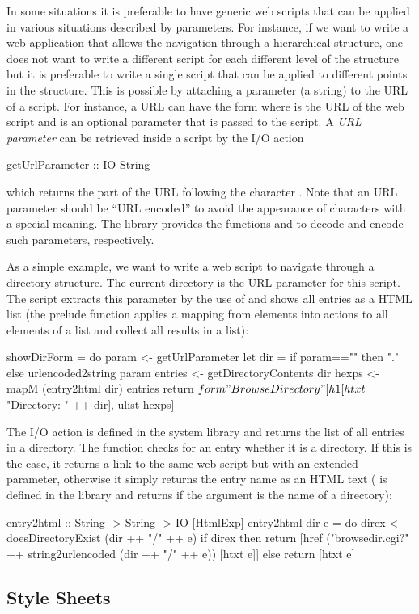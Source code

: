 In some situations it is preferable to have generic web scripts that
can be applied in various situations described by parameters.
For instance, if we want to write a web application that
allows the navigation through a hierarchical structure,
one does not want to write a different script for each different
level of the structure but it is preferable to write a single
script that can be applied to different points in the structure.
This is possible by attaching a parameter (a string)
to the URL of a script. For instance, a URL can have the form
 where
 is the URL of the web script
and  is an optional parameter that is passed
to the script.
A \emph{URL parameter}
can be retrieved inside a script
by the I/O action
%
\begin{curry}
getUrlParameter :: IO String
\end{curry}
%
which returns the part of the URL following the character .
Note that an URL parameter should be ``URL encoded'' to avoid
the appearance of characters with a special meaning.
The library  provides the functions
 and 
to decode and encode such parameters, respectively.

As a simple example, we want to write a web script to navigate
through a directory structure. The current directory
is the URL parameter for this script. The script
extracts this parameter by the use of 
and shows all entries as a HTML list
(the prelude function  applies
a mapping from elements into actions to all elements of a list
and collect all results in a list):
%
\begin{curry}
showDirForm = do
  param <- getUrlParameter
  let dir = if param=="" then "." else urlencoded2string param
  entries <- getDirectoryContents dir
  hexps <- mapM (entry2html dir) entries
  return $ form "Browse Directory"
                [h1 [htxt $ "Directory: " ++ dir], ulist hexps]
\end{curry}
%
The I/O action 
is defined in the system library 
and returns the list of all entries in a directory.
The function  checks for an entry whether it
is a directory. If this is the case, it returns a link to
the same web script but with an extended parameter, otherwise
it simply returns the entry name as an HTML text
(
is defined in the library  and returns 
if the argument is the name of a directory):
%
\begin{curry}
entry2html :: String -> String -> IO [HtmlExp]
entry2html dir e = do
  direx <- doesDirectoryExist (dir ++ "/" ++ e)
  if direx
   then return [href ("browsedir.cgi?" ++ string2urlencoded (dir ++ "/" ++ e))
                     [htxt e]]
   else return [htxt e]
\end{curry}
%


\subsection{Style Sheets}



